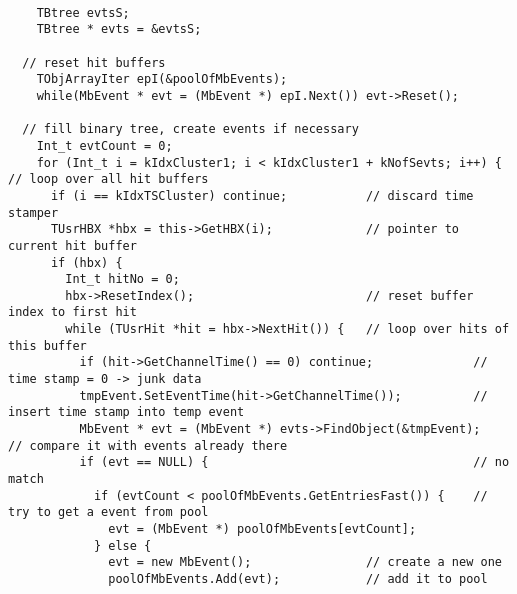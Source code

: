 \documentclass[10pt]{article}
\newenvironment{yellowboxed}
	{\begin{Sbox}\begin{minipage}[t]}
	{\end{minipage}\end{Sbox}\colorbox{yellow}{\TheSbox}}
\begin{document}
\begin{center}
\begin{table}[H]
{\begin{yellowboxed}{\linewidth}
\verb+  +\\
\verb+    TBtree evtsS;+\\
\verb+    TBtree * evts = &evtsS;+\\
\verb+  +\\
\verb+  // reset hit buffers+\\
\verb+    TObjArrayIter epI(&poolOfMbEvents);+\\
\verb+    while(MbEvent * evt = (MbEvent *) epI.Next()) evt->Reset();+\\
\verb+  +\\
\verb+  // fill binary tree, create events if necessary+\\
\verb+    Int_t evtCount = 0;+\\
\verb-    for (Int_t i = kIdxCluster1; i < kIdxCluster1 + kNofSevts; i++) {    // loop over all hit buffers-\\
\verb+      if (i == kIdxTSCluster) continue;           // discard time stamper+\\
\verb+      TUsrHBX *hbx = this->GetHBX(i);             // pointer to current hit buffer+\\
\verb+      if (hbx) {+\\
\verb+        Int_t hitNo = 0;+\\
\verb+        hbx->ResetIndex();                        // reset buffer index to first hit+\\
\verb+        while (TUsrHit *hit = hbx->NextHit()) {   // loop over hits of this buffer+\\
\verb+          if (hit->GetChannelTime() == 0) continue;              // time stamp = 0 -> junk data+\\
\verb+          tmpEvent.SetEventTime(hit->GetChannelTime());          // insert time stamp into temp event+\\
\verb+          MbEvent * evt = (MbEvent *) evts->FindObject(&tmpEvent);   // compare it with events already there+\\
\verb+          if (evt == NULL) {                                     // no match+\\
\verb+            if (evtCount < poolOfMbEvents.GetEntriesFast()) {    // try to get a event from pool+\\
\verb+              evt = (MbEvent *) poolOfMbEvents[evtCount];+\\
\verb+            } else {+\\
\verb+              evt = new MbEvent();                // create a new one+\\
\verb+              poolOfMbEvents.Add(evt);            // add it to pool+\\

\end{yellowboxed}}
\end{table}
\end{center}
\end{document}
